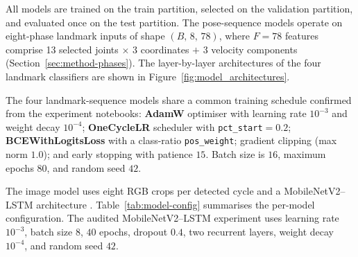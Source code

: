 All models are trained on the train partition, selected on the validation
partition, and evaluated once on the test partition. The pose-sequence models
operate on eight-phase landmark inputs of shape $(B,\,8,\,78)$, where
$F{=}78$ features comprise 13 selected joints $\times$ 3 coordinates $+$ 3
velocity components (Section~\ref{sec:method-phases}). The layer-by-layer
architectures of the four landmark classifiers are shown in
Figure~\ref{fig:model_architectures}.

The four landmark-sequence models share a common training schedule confirmed
from the experiment notebooks: \textbf{AdamW} optimiser with learning rate
$10^{-3}$ and weight decay $10^{-4}$; \textbf{OneCycleLR} scheduler with
\texttt{pct\_start}$=0.2$; \textbf{BCEWithLogitsLoss} with a class-ratio
\texttt{pos\_weight}; gradient clipping (max norm $1.0$); and early stopping
with patience $15$. Batch size is $16$, maximum epochs $80$, and random seed
$42$.

The image model uses eight RGB crops per detected cycle and a MobileNetV2--LSTM
architecture \cite{sandler2018mobilenetv2, donahue2015lrcn}.
Table~\ref{tab:model-config} summarises the per-model configuration.
The audited MobileNetV2--LSTM experiment uses learning rate $10^{-3}$, batch
size $8$, $40$ epochs, dropout $0.4$, two recurrent layers, weight decay
$10^{-4}$, and random seed $42$.


